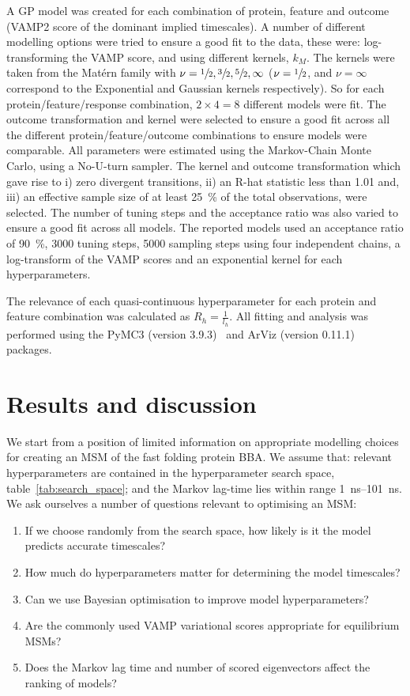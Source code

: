 \documentclass[journal=jacsat,manuscript=article]{achemso}
\begin{document}
 A GP model was created for each combination of protein, feature and outcome (VAMP2 score of the dominant implied timescales). A number of different modelling options were tried to ensure a good fit to the data, these were: log-transforming the VAMP score, and using different kernels, $k_{M}$. The kernels were taken from the Mat\'ern family with $\nu=\sfrac{1}{2}, \sfrac{3}{2}, \sfrac{5}{2}, \infty$ ($\nu=\sfrac{1}{2}$, and $\nu=\infty$ correspond to the Exponential and Gaussian kernels respectively). So for each protein/feature/response combination, $2\times 4 =8$ different models were fit. The outcome transformation and kernel were selected to ensure a good fit across all the different protein/feature/outcome combinations to ensure models were comparable. All parameters were estimated using the Markov-Chain Monte Carlo, using a No-U-turn sampler. The kernel and outcome transformation which gave rise to i) zero divergent transitions, ii) an R-hat statistic less than 1.01 and,  iii) an effective sample size of at least \SI{25}{\percent} of the total observations,  were selected. The number of tuning steps and the acceptance ratio was also varied to ensure a good fit across all models. The reported models used an acceptance ratio of \SI{90}{\percent}, \num{3000} tuning steps, \num{5000} sampling steps using four independent chains, a log-transform of the VAMP scores and an exponential kernel for each hyperparameters. 
 
 The relevance of each quasi-continuous hyperparameter for each protein and feature combination was calculated as $R_{h} = \frac{1}{l_{h}}$. 
 All fitting and analysis was performed using the PyMC3 (version 3.9.3)~\cite{salvatierProbabilisticProgrammingPython2016} and ArViz (version 0.11.1)~\cite{arviz_2019} packages. 
 
 

\section{Results and discussion}

We start from a position of limited information on appropriate modelling choices for creating an MSM of the fast folding protein BBA.  We assume that: 
relevant hyperparameters are contained in the  hyperparameter search space, table~\ref{tab:search_space}; and the Markov lag-time lies within range \SIrange{1}{101}{\nano\second}.  We  ask ourselves a number of questions relevant to optimising an MSM:

\begin{enumerate}
    \item If we choose randomly from the search space, how likely is it the model predicts accurate timescales? 
    \item How much do hyperparameters matter for determining the model timescales? 
    \item Can we use Bayesian optimisation to improve model hyperparameters? 
    \item Are the commonly used VAMP variational scores appropriate for equilibrium MSMs? 
    \item Does the Markov lag time and number of scored eigenvectors affect the ranking of models?  
\end{enumerate}
\end{document}

